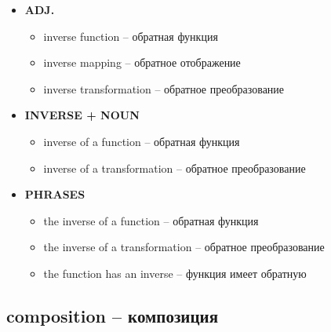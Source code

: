 \documentclass[a4paper, 10pt]{article}
\theoremstyle{definition}
\theoremstyle{plain}
\theoremstyle{remark}
\begin{document}
\begin{itemize}
    \item \textbf{ADJ.}
    \begin{itemize}
        \item inverse function – обратная функция
        \item inverse mapping – обратное отображение
        \item inverse transformation – обратное преобразование
    \end{itemize}
    
    \item \textbf{INVERSE + NOUN}
    \begin{itemize}
        \item inverse of a function – обратная функция
        \item inverse of a transformation – обратное преобразование
    \end{itemize}
    
    \item \textbf{PHRASES}
    \begin{itemize}
        \item the inverse of a function – обратная функция
        \item the inverse of a transformation – обратное преобразование
        \item the function has an inverse – функция имеет обратную
    \end{itemize}
\end{itemize}

\subsection{composition – композиция}
\end{document}
